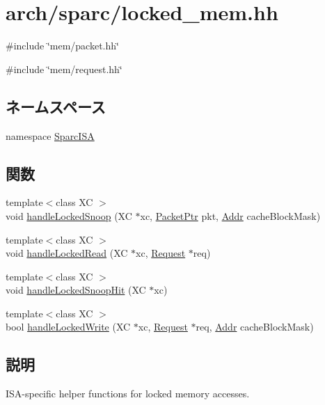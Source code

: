 \hypertarget{sparc_2locked__mem_8hh}{
\section{arch/sparc/locked\_\-mem.hh}
\label{sparc_2locked__mem_8hh}
}
{\ttfamily \#include \char`\"{}mem/packet.hh\char`\"{}}\par
{\ttfamily \#include \char`\"{}mem/request.hh\char`\"{}}\par
\subsection*{ネームスペース}
\begin{DoxyCompactItemize}
\item 
namespace \hyperlink{namespaceSparcISA}{SparcISA}
\end{DoxyCompactItemize}
\subsection*{関数}
\begin{DoxyCompactItemize}
\item 
{\footnotesize template$<$class XC $>$ }\\void \hyperlink{namespaceSparcISA_a1118bbdd22f21a6b48b9cb896bf5936e}{handleLockedSnoop} (XC $\ast$xc, \hyperlink{classPacket}{PacketPtr} pkt, \hyperlink{base_2types_8hh_af1bb03d6a4ee096394a6749f0a169232}{Addr} cacheBlockMask)
\item 
{\footnotesize template$<$class XC $>$ }\\void \hyperlink{namespaceSparcISA_a1d5d45cf417e886718ca52e167707a6c}{handleLockedRead} (XC $\ast$xc, \hyperlink{classRequest}{Request} $\ast$req)
\item 
{\footnotesize template$<$class XC $>$ }\\void \hyperlink{namespaceSparcISA_a814f89ef85d9ebdb602f6b241ea40142}{handleLockedSnoopHit} (XC $\ast$xc)
\item 
{\footnotesize template$<$class XC $>$ }\\bool \hyperlink{namespaceSparcISA_a51c8abbc4167f28f928dcf5413bfd23d}{handleLockedWrite} (XC $\ast$xc, \hyperlink{classRequest}{Request} $\ast$req, \hyperlink{base_2types_8hh_af1bb03d6a4ee096394a6749f0a169232}{Addr} cacheBlockMask)
\end{DoxyCompactItemize}


\subsection{説明}
ISA-\/specific helper functions for locked memory accesses. 